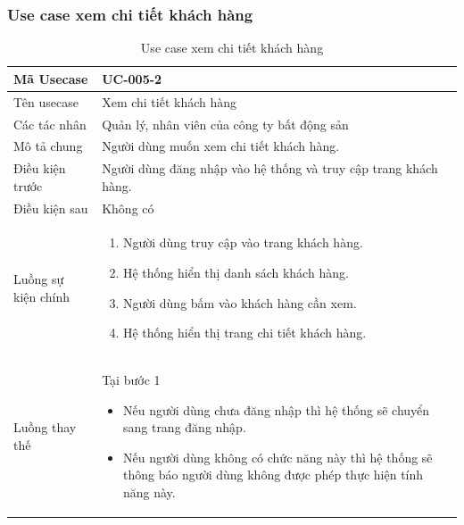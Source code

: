 \documentclass[12pt,a4paper]{article}
\begin{document}
    \subsubsection*{Use case xem chi tiết khách hàng }
    \begin{table}[H]
        \centering
        \begin{tabular}{|p{3.5cm}|p{11.5cm}|c|}
            \hline
            Mã Usecase      & UC-005-2                                                        \\
            \hline
            Tên usecase     & Xem chi tiết khách hàng                                         \\
            \hline
            Các tác nhân    & Quản lý, nhân viên của công ty bất động sản                     \\
            \hline
            Mô tả chung     & Người dùng muốn xem chi tiết khách hàng.                        \\
            \hline

            Điều kiện trước & Người dùng đăng nhập vào hệ thống và truy cập trang khách hàng. \\
            \hline

            Điều kiện sau   & Không có                                                        \\
            \hline

            Luồng sự kiện chính & \vspace{-.8cm}\begin{enumerate}
                                                    \item Người dùng truy cập vào trang khách hàng.
                                                    \item Hệ thống hiển thị danh sách khách hàng.
                                                    \item Người dùng bấm vào khách hàng cần xem.
                                                    \item Hệ thống hiển thị trang chi tiết khách hàng.
            \end{enumerate}
            \\
            \hline
            Luồng thay thế & Tại bước 1\newline
            \vspace{-.8cm}\begin{itemize}
                              \item Nếu người dùng chưa đăng nhập thì hệ thống sẽ chuyển sang trang đăng nhập.
                              \item  Nếu người dùng không có chức năng này thì hệ thống sẽ thông báo người dùng không được phép thực hiện tính năng này.
            \end{itemize}

            \\    \hline
        \end{tabular}
        \caption{Use case xem chi tiết khách hàng }
    \end{table}
\end{document}
